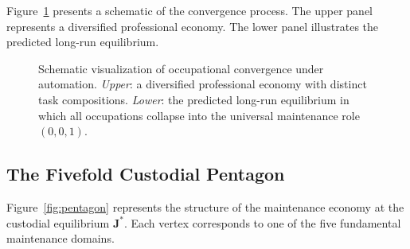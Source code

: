 \documentclass[12pt,a4paper]{article}
\theoremstyle{plain}
\theoremstyle{definition}
\theoremstyle{remark}
\begin{document}
Figure~\ref{fig:collapse} presents a schematic of the convergence process.
The upper panel represents a diversified professional economy.  The lower
panel illustrates the predicted long-run equilibrium.

\begin{figure}[h]
\centering


\vspace{1.2em}


\caption{Schematic visualization of occupational convergence under automation.
\textit{Upper}: a diversified professional economy with distinct task
compositions. \textit{Lower}: the predicted long-run equilibrium in which all
occupations collapse into the universal maintenance role $(0,0,1)$.}
\label{fig:collapse}
\end{figure}

\subsection{The Fivefold Custodial Pentagon}

Figure~\ref{fig:pentagon} represents the structure of the maintenance economy
at the custodial equilibrium $\mathbf{J}^*$.  Each vertex corresponds to one
of the five fundamental maintenance domains.
\end{document}
